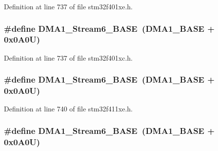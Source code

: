 Definition at line 737 of file stm32f401xe.\+h.

\subsubsection[{\texorpdfstring{D\+M\+A1\+\_\+\+Stream6\+\_\+\+B\+A\+SE}{DMA1_Stream6_BASE}}]{\setlength{\rightskip}{0pt plus 5cm}\#define D\+M\+A1\+\_\+\+Stream6\+\_\+\+B\+A\+SE~({\bf D\+M\+A1\+\_\+\+B\+A\+SE} + 0x0\+A0\+U)}\hypertarget{group___peripheral__registers__structures_ga58998ddc40adb6361704d6c9dad08125}{}\label{group___peripheral__registers__structures_ga58998ddc40adb6361704d6c9dad08125}


Definition at line 737 of file stm32f401xc.\+h.

\subsubsection[{\texorpdfstring{D\+M\+A1\+\_\+\+Stream6\+\_\+\+B\+A\+SE}{DMA1_Stream6_BASE}}]{\setlength{\rightskip}{0pt plus 5cm}\#define D\+M\+A1\+\_\+\+Stream6\+\_\+\+B\+A\+SE~({\bf D\+M\+A1\+\_\+\+B\+A\+SE} + 0x0\+A0\+U)}\hypertarget{group___peripheral__registers__structures_ga58998ddc40adb6361704d6c9dad08125}{}\label{group___peripheral__registers__structures_ga58998ddc40adb6361704d6c9dad08125}


Definition at line 740 of file stm32f411xe.\+h.

\subsubsection[{\texorpdfstring{D\+M\+A1\+\_\+\+Stream6\+\_\+\+B\+A\+SE}{DMA1_Stream6_BASE}}]{\setlength{\rightskip}{0pt plus 5cm}\#define D\+M\+A1\+\_\+\+Stream6\+\_\+\+B\+A\+SE~({\bf D\+M\+A1\+\_\+\+B\+A\+SE} + 0x0\+A0\+U)}\hypertarget{group___peripheral__registers__structures_ga58998ddc40adb6361704d6c9dad08125}{}\label{group___peripheral__registers__structures_ga58998ddc40adb6361704d6c9dad08125}



